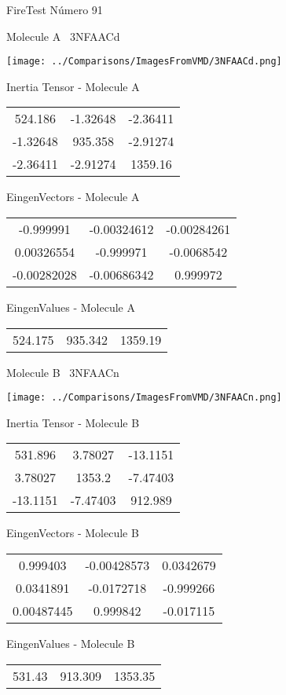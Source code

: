 \vtab[-3cm]
\begin{center}
{\large FireTest \tab Número 91}
\end{center}
\begin{multicols}{2}
\begin{center}

Molecule A \
3NFAACd

\texttt{[image: ../Comparisons/ImagesFromVMD/3NFAACd.png]}

Inertia Tensor - Molecule A \\
\begin{tabular}{|c c c|}
524.186	 & 	-1.32648	 & 	-2.36411	 \\
-1.32648	 & 	935.358	 & 	-2.91274	 \\
-2.36411	 & 	-2.91274	 & 	1359.16
\end{tabular}

\vtab
 EingenVectors - Molecule A     \\
\begin{tabular}{|c c c|}
-0.999991	 & 	-0.00324612	 & 	-0.00284261	 \\
0.00326554	 & 	-0.999971	 & 	-0.0068542	 \\
-0.00282028	 & 	-0.00686342	 & 	0.999972
\end{tabular}

\vtab
 EingenValues - Molecule A     \\
\begin{tabular}{|c c c|}
524.175	 & 	935.342	 & 	1359.19	 \\
\end{tabular}
\columnbreak

Molecule B \
3NFAACn

\texttt{[image: ../Comparisons/ImagesFromVMD/3NFAACn.png]}

Inertia Tensor - Molecule B \\
\begin{tabular}{|c c c|}
531.896	 & 	3.78027	 & 	-13.1151	 \\
3.78027	 & 	1353.2	 & 	-7.47403	 \\
-13.1151	 & 	-7.47403	 & 	912.989
\end{tabular}

\vtab
 EingenVectors - Molecule B     \\
\begin{tabular}{|c c c|}
0.999403	 & 	-0.00428573	 & 	0.0342679	 \\
0.0341891	 & 	-0.0172718	 & 	-0.999266	 \\
0.00487445	 & 	0.999842	 & 	-0.017115
\end{tabular}

\vtab
 EingenValues - Molecule B     \\
\begin{tabular}{|c c c|}
531.43	 & 	913.309	 & 	1353.35	 \\
\end{tabular}

\end{center}
\end{multicols}

